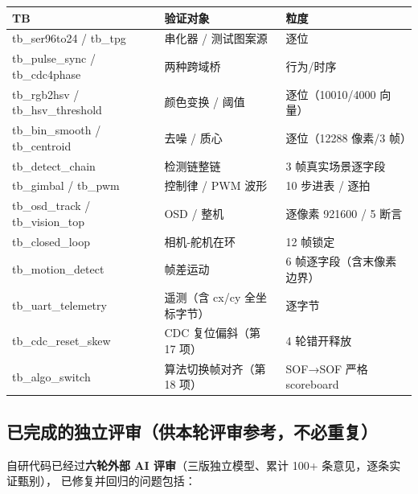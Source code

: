 \documentclass[10pt]{ctexart}
\begin{document}
\begin{center}
\begin{tabular}{lll}
\toprule
\rowcolor{rowtint}\textbf{TB} & \textbf{验证对象} & \textbf{粒度} \\
\midrule
tb\_ser96to24 / tb\_tpg & 串化器 / 测试图案源 & 逐位 \\
tb\_pulse\_sync / tb\_cdc4phase & 两种跨域桥 & 行为/时序 \\
tb\_rgb2hsv / tb\_hsv\_threshold & 颜色变换 / 阈值 & 逐位（10010/4000 向量）\\
tb\_bin\_smooth / tb\_centroid & 去噪 / 质心 & 逐位（12288 像素/3 帧）\\
tb\_detect\_chain & 检测链整链 & 3 帧真实场景逐字段 \\
tb\_gimbal / tb\_pwm & 控制律 / PWM 波形 & 10 步进表 / 逐拍 \\
tb\_osd\_track / tb\_vision\_top & OSD / 整机 & 逐像素 921600 / 5 断言 \\
tb\_closed\_loop & 相机-舵机在环 & 12 帧锁定 \\
tb\_motion\_detect & 帧差运动 & 6 帧逐字段（含末像素边界）\\
tb\_uart\_telemetry & 遥测（含 cx/cy 全坐标字节） & 逐字节 \\
tb\_cdc\_reset\_skew & CDC 复位偏斜（第 17 项） & 4 轮错开释放 \\
tb\_algo\_switch & 算法切换帧对齐（第 18 项） & SOF→SOF 严格 scoreboard \\
\bottomrule
\end{tabular}
\end{center}

\subsection{已完成的独立评审（供本轮评审参考，不必重复）}

自研代码已经过\textbf{六轮外部 AI 评审}（三版独立模型、累计 100+ 条意见，逐条实证甄别），
已修复并回归的问题包括：
\end{document}
